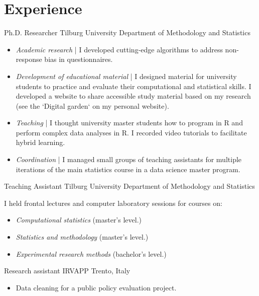 \section{Experience}

{Ph.D. Researcher}
{Tilburg University} %
{} %
{Department of Methodology and Statistics}   %
{
    \begin{itemize}
        \item \textit{Academic research} | I developed cutting-edge algorithms to address non-response bias in questionnaires.
        \item \textit{Development of educational material} | I designed material for university students to practice and evaluate their computational and statistical skills. I developed a website to share accessible study material based on my research (see the `Digital garden` on my personal website).
        \item \textit{Teaching} | I thought university master students how to program in R and perform complex data analyses in R. I recorded video tutorials to facilitate hybrid learning.
        \item \textit{Coordination} | I managed small groups of teaching assistants for multiple iterations of the main statistics course in a data science master program.
    \end{itemize}
}

{Teaching Assistant}
{Tilburg University} %
{} %
{Department of Methodology and Statistics}   %
{
    I held frontal lectures and computer laboratory sessions for courses on:
    \begin{itemize}
        \item \textit{Computational statistics} (master's level.)
		\item \textit{Statistics and methodology} (master's level.)
		\item \textit{Experimental research methods} (bachelor's level.)
    \end{itemize}
}

{Research assistant}
{IRVAPP} %
{Trento, Italy} %
{}   %
{
    \begin{itemize}
        \item Data cleaning for a public policy evaluation project.
    \end{itemize}
}

